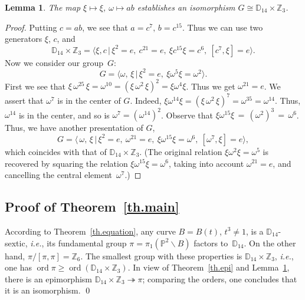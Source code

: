 \documentclass{amsart}
\newtheorem{lemma}[subsubsection]{Lemma}
\theoremstyle{remark}
\numberwithin{equation}{section}
\let\Bbb\mathbb
\let\curve=B
\let\sminus\smallsetminus
\let\ge\geqslant
\let\1e
\let\Go\omega
\begin{document}
\begin{lemma}\label{G=DZ}
The map $\xi\mapsto\xi$, $\omega\mapsto ab$ establishes an
isomorphism $G\cong{\Bbb D_{{14}}}\times{{\Bbb Z}_{3}}$.
\end{lemma}

\begin{proof}
Putting $c=ab$, we see that
$a=c^7,\,b=c^{15}$. Thus we can use two generators $\xi$, $c$, and
\[
  {\Bbb D_{{14}}}\times{{\Bbb Z}_{3}}=\langle \xi,c\,|\,
\xi^2=\1,\ c^{21}=\1,\ \xi c^{15}\xi=c^6,\ [c^7,\xi]=\1\rangle.
\]
Now we consider our group~$G$:
\[
 G=\langle \omega,\,\xi\,|\,\xi^2=\1,\ \xi\omega^5\xi=\omega^2
\rangle.
\]
First we see that
$\xi\,\omega^{25}\,\xi=\omega^{10}=(\xi\,\omega^2\,\xi)^2=\xi\omega^{4}\xi$.
Thus we get $\omega^{21}=\1$.
We assert that $\omega^7$ is in the center of $G$.
Indeed,
$\xi\omega^{14}\xi=(\xi\,\omega^2\,\xi)^7=\omega^{35}=\omega^{14}$.
Thus, $\omega^{14}$ is in the center,
and so is
$\omega^7=(\omega^{14})^2$.
Observe that
$\xi\omega^{15}\xi\,=\, (\omega^2)^3\,=\,\omega^6$.
Thus, we have another presentation of $G$,
\[
 G=\langle\,\omega,\,\xi\,|\, \xi^2=\1,\
\omega^{21}=\1,\ \xi\omega^{15}\xi=\omega^6,\ [\omega^7,\xi]=\1
\rangle,
\]
which coincides with that of ${\Bbb D_{{14}}}\times{{\Bbb Z}_{3}}$.
(The original relation $\xi\omega^2\xi=\omega^5$ is recovered
by squaring the relation
$\xi\omega^{15}\xi=\omega^6$, taking
into account $\Go^{21}=\1$, and
cancelling the central element~$\Go^7$.)
\end{proof}

\subsection{Proof of Theorem~\ref{th.main}}\label{proof.main}
According to Theorem~\ref{th.equation},
any curve $\curve=\curve(t)$,
$t^3\ne1$, is a {{${\Bbb D_{{{14}}}}$}}-sextic, {\emph{i.e.}}, its fundamental group
$\pi=\pi_1({\Bbb P^{2}}\sminus\curve)$ factors to~${\Bbb D_{{14}}}$. On the other
hand,
$\pi/[\pi,\pi]={{\Bbb Z}_{6}}$. The smallest group with these properties
is ${\Bbb D_{{14}}}\times{{\Bbb Z}_{3}}$, {\emph{i.e.}},
one has ${\operatorname{ord}}\pi\ge{\operatorname{ord}}({\Bbb D_{{14}}}\times{{\Bbb Z}_{3}})$.
In view of Theorem~\ref{th.epi} and Lemma~\ref{G=DZ}, there is
an epimorphism ${\Bbb D_{{14}}}\times{{\Bbb Z}_{3}}\twoheadrightarrow\pi$; comparing
the orders, one concludes that it
is an isomorphism.
\qed
\end{document}

